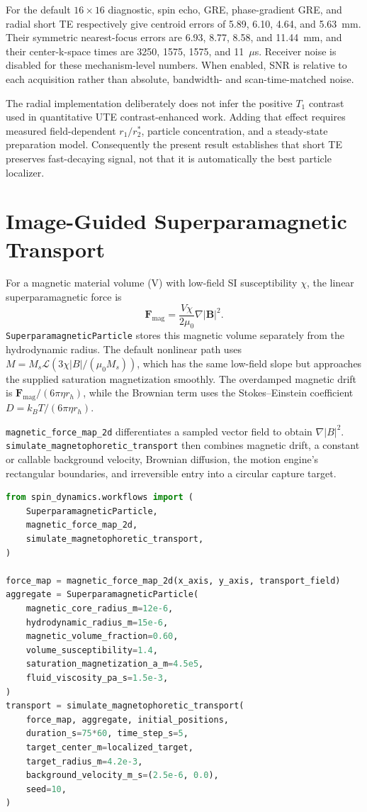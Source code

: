 \documentclass[11pt,oneside]{report}
\newcommand{\code}[1]{\texttt{#1}}
\begin{document}
For the default $16\mathbin{\times}16$ diagnostic, spin echo, GRE,
phase-gradient GRE, and radial short TE respectively give centroid errors of
5.89, 6.10, 4.64, and 5.63~mm. Their symmetric nearest-focus errors are 6.93,
8.77, 8.58, and 11.44~mm, and their center-k-space times are 3250, 1575, 1575,
and 11~$\mu$s. Receiver noise is disabled for these mechanism-level numbers.
When enabled, SNR is relative to each acquisition rather than absolute,
bandwidth- and scan-time-matched noise.

The radial implementation deliberately does not infer the positive $T_1$
contrast used in quantitative UTE contrast-enhanced work. Adding that effect
requires measured field-dependent $r_1/r_2^*$, particle concentration, and a
steady-state preparation model. Consequently the present result establishes
that short TE preserves fast-decaying signal, not that it is automatically the
best particle localizer.

\section{Image-Guided Superparamagnetic Transport}

For a magnetic material volume (V) with low-field SI susceptibility
\(\chi\), the linear superparamagnetic force is
\[
  \mathbf{F}_{\mathrm{mag}}
  = \frac{V\chi}{2\mu_0}\nabla |\mathbf{B}|^2.
\]
\code{SuperparamagneticParticle} stores this magnetic volume separately from
the hydrodynamic radius. The default nonlinear path uses
\(M=M_s\mathcal{L}(3\chi|B|/(\mu_0M_s))\), which has the same low-field slope
but approaches the supplied saturation magnetization smoothly. The overdamped
magnetic drift is \(\mathbf{F}_{\mathrm{mag}}/(6\pi\eta r_h)\), while the
Brownian term uses the Stokes--Einstein coefficient
\(D=k_BT/(6\pi\eta r_h)\).

\code{magnetic\_force\_map\_2d} differentiates a sampled vector field to obtain
\(\nabla|B|^2\). \code{simulate\_magnetophoretic\_transport} then combines
magnetic drift, a constant or callable background velocity, Brownian
diffusion, the motion engine's rectangular boundaries, and irreversible entry
into a circular capture target.

\begin{lstlisting}[language=Python]
from spin_dynamics.workflows import (
    SuperparamagneticParticle,
    magnetic_force_map_2d,
    simulate_magnetophoretic_transport,
)

force_map = magnetic_force_map_2d(x_axis, y_axis, transport_field)
aggregate = SuperparamagneticParticle(
    magnetic_core_radius_m=12e-6,
    hydrodynamic_radius_m=15e-6,
    magnetic_volume_fraction=0.60,
    volume_susceptibility=1.4,
    saturation_magnetization_a_m=4.5e5,
    fluid_viscosity_pa_s=1.5e-3,
)
transport = simulate_magnetophoretic_transport(
    force_map, aggregate, initial_positions,
    duration_s=75*60, time_step_s=5,
    target_center_m=localized_target,
    target_radius_m=4.2e-3,
    background_velocity_m_s=(2.5e-6, 0.0),
    seed=10,
)
\end{lstlisting}
\end{document}
